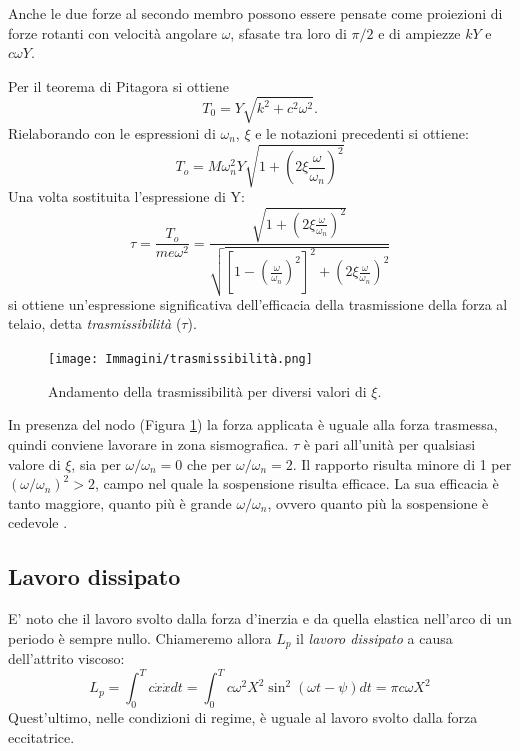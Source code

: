 Anche le due forze al secondo membro possono essere pensate come proiezioni di forze rotanti con velocità angolare $\omega$, sfasate tra loro di $\pi/2$ e di ampiezze $k Y$ e $c\omega Y$.

Per il teorema di Pitagora si ottiene
\begin{equation}
    T_0=Y\sqrt{k^2+c^2\omega^2}.
\end{equation}
Rielaborando con le espressioni di $\omega_n$, $\xi$ e le notazioni precedenti si ottiene:
\begin{equation}
    T_o=M\omega_n^2Y\sqrt{1+(2\xi \frac{\omega}{\omega_n})^2}
\end{equation}
Una volta sostituita l'espressione di Y:
\begin{equation}
  \tau =  \frac{T_o}{me\omega^2}=\frac{\sqrt{1+(2\xi \frac{\omega}{\omega_n})^2}}{\sqrt{[1-(\frac{\omega}{\omega_n})^2]^2+(2\xi\frac{\omega}{\omega_n})^2}}
\end{equation}
si ottiene un'espressione significativa dell'efficacia della trasmissione della forza al telaio, detta \textit{trasmissibilità} ($\tau$).
\begin{figure}[h]
    \centering
    \texttt{[image: Immagini/trasmissibilità.png]}
    \caption{Andamento della trasmissibilità per diversi valori di $\xi$.}
    \label{trasmissibilità}
\end{figure}
In presenza del nodo (Figura \ref{trasmissibilità}) la forza applicata è uguale alla forza trasmessa, quindi conviene lavorare in zona sismografica. $\tau$ è pari all'unità per qualsiasi valore di $\xi$, sia per $\omega/\omega_n=0$ che per $\omega/\omega_n=2$. Il rapporto risulta minore di 1 per $(\omega/\omega_n)^2>2$, campo nel quale la sospensione risulta efficace. La sua efficacia è tanto maggiore, quanto più è grande $\omega/\omega_n$, ovvero quanto più la sospensione è cedevole \cite{meneghetti2010lezioni}.
\subsection{Lavoro dissipato}
E' noto che il lavoro svolto dalla forza d'inerzia e da quella elastica nell'arco di un periodo è sempre nullo. Chiameremo allora $L_p$ il \textit{lavoro dissipato} a causa dell'attrito viscoso:
\begin{equation}
    L_p=\int_{0}^{T}c\dot x\dot x dt=\int_{0}^{T}c\omega^2 X^2 \sin^2(\omega t-\psi)dt=\pi c\omega X^2
\end{equation}
 Quest'ultimo, nelle condizioni di regime, è uguale al lavoro svolto dalla forza eccitatrice.